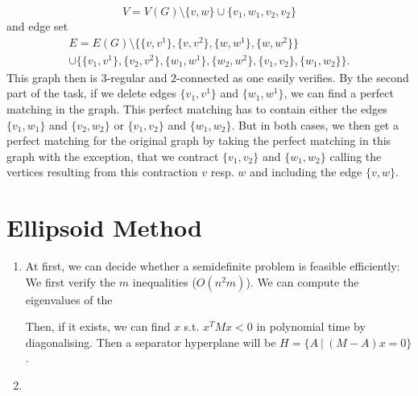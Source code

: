 \documentclass{scrartcl}
\newcommand\1{\mathbf{1}}
\begin{document}
\begin{enumerate}
\[
V = V(G) \setminus \{v,w\}\cup \{v_1, w_1, v_2, v_2\}
\]
and edge set 
\begin{multline*}
E=E(G) \setminus \{\{v,v^1\},\{v,v^2\},\{w,w^1\},\{w,w^2\}\}\\ \cup \{\{v_1,v^1\},\{v_2,v^2\},\{w_1,w^1\},\{w_2,w^2\},\{v_1,v_2\},\{w_1,w_2\}\}.
\end{multline*}
This graph then is $3$-regular and $2$-connected as one easily verifies. By the second part of the task, if we delete edges $\{v_1,v^1\}$ and $\{w_1,w^1\}$, we can find a perfect matching in the graph. This perfect matching has to contain either the edges $\{v_1,w_1\}$ and $\{v_2,w_2\}$ or $\{v_1, v_2\}$ and $\{w_1, w_2\}$. But in both cases, we then get a perfect matching for the original graph by taking the perfect matching in this graph with the exception, that we contract $\{v_1, v_2\}$ and $\{w_1, w_2\}$ calling the vertices resulting from this contraction $v$ resp. $w$ and including the edge $\{v,w\}$. 
\end{enumerate}

\section{Ellipsoid Method}
\begin{enumerate}
\item
At first, we can decide whether a semidefinite problem is feasible efficiently: We first verify the $m$ inequalities ($O(n^2m)$). We can compute the eigenvalues of the 

Then, if it exists, we can find $x$ s.t. $x^T M x < 0$ in polynomial time by diagonalising. Then a separator hyperplane will be $H = \{A\ |\ (M-A) x = 0\}$. 

\item


\end{enumerate}
\end{document}
